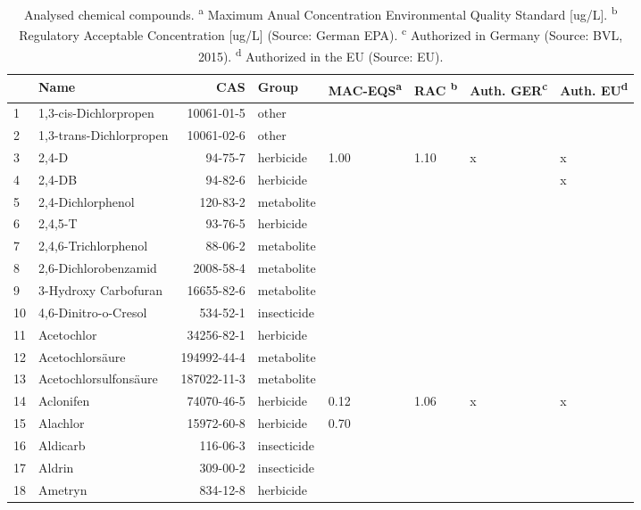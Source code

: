 \begingroup\fontsize{8pt}{10pt}\selectfont
\begin{longtable}{lp{4cm}rlp{1cm}p{1.5cm}p{1.5cm}p{1cm}}
\caption{Analysed chemical compounds. 
                    \textsuperscript{a} Maximum Anual Concentration Environmental Quality Standard [ug/L].
                    \textsuperscript{b} Regulatory Acceptable Concentration [ug/L] (Source: German EPA).
                    \textsuperscript{c} Authorized in Germany (Source: BVL, 2015). 
                    \textsuperscript{d} Authorized in the EU (Source: EU).} \\ 
  \toprule
 & Name & CAS & Group & MAC-EQS\textsuperscript{a} & RAC \textsuperscript{b} & Auth. GER\textsuperscript{c} & Auth. EU\textsuperscript{d} \\ 
  \midrule
1 & 1,3-cis-Dichlorpropen & 10061-01-5 & other &  &  &  &  \\ 
  2 & 1,3-trans-Dichlorpropen & 10061-02-6 & other &  &  &  &  \\ 
  3 & 2,4-D & 94-75-7 & herbicide & 1.00 & 1.10 & x & x \\ 
  4 & 2,4-DB & 94-82-6 & herbicide &  &  &  & x \\ 
  5 & 2,4-Dichlorphenol & 120-83-2 & metabolite &  &  &  &  \\ 
  6 & 2,4,5-T & 93-76-5 & herbicide &  &  &  &  \\ 
  7 & 2,4,6-Trichlorphenol & 88-06-2 & metabolite &  &  &  &  \\ 
  8 & 2,6-Dichlorobenzamid & 2008-58-4 & metabolite &  &  &  &  \\ 
  9 & 3-Hydroxy Carbofuran & 16655-82-6 & metabolite &  &  &  &  \\ 
  10 & 4,6-Dinitro-o-Cresol & 534-52-1 & insecticide &  &  &  &  \\ 
  11 & Acetochlor & 34256-82-1 & herbicide &  &  &  &  \\ 
  12 & Acetochlorsäure & 194992-44-4 & metabolite &  &  &  &  \\ 
  13 & Acetochlorsulfonsäure & 187022-11-3 & metabolite &  &  &  &  \\ 
  14 & Aclonifen & 74070-46-5 & herbicide & 0.12 & 1.06 & x & x \\ 
  15 & Alachlor & 15972-60-8 & herbicide & 0.70 &  &  &  \\ 
  16 & Aldicarb & 116-06-3 & insecticide &  &  &  &  \\ 
  17 & Aldrin & 309-00-2 & insecticide &  &  &  &  \\ 
  18 & Ametryn & 834-12-8 & herbicide &  &  &  &  \\ 

\end{longtable}
